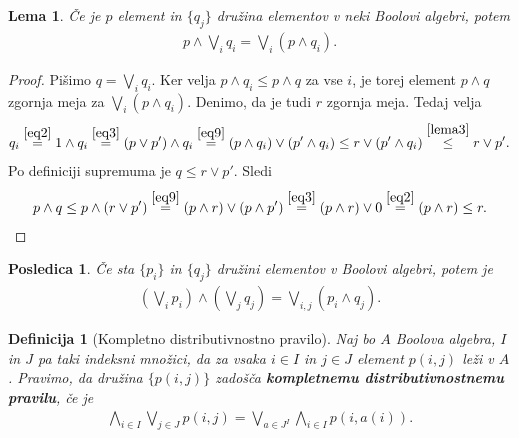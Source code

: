 \documentclass{amsart}
\newtheorem{lema}[izrek]{Lema}
\newtheorem{posledica}[izrek]{Posledica}
\newtheorem{definicija}[izrek]{Definicija}
\begin{document}
\begin{lema}
    Če je \(p\) element in \(\{q_j\}\) družina elementov v neki Boolovi algebri, potem
    \begin{align*}
        p \wedge \bigvee_i q_i = \bigvee_i (p \wedge q_i).
    \end{align*}
    \label{notnes}
\end{lema}

\begin{proof}
    Pišimo \(q = \bigvee_i q_i\). Ker velja \(p \wedge q_i \leq p \wedge q\) za vse \(i\),
    je torej element \(p \wedge q\) zgornja meja za \(\bigvee_i (p \wedge q_i).\)
    Denimo, da je tudi \(r\) zgornja meja. Tedaj velja
    \begin{align*}
        q_i \stackrel{\eqref{eq2}}{=} 1 \wedge q_i \stackrel{\eqref{eq3}}{=} (p \vee p') \wedge q_i \stackrel{\eqref{eq9}}{=} \left(p \wedge q_i\right) \vee
        \left(p' \wedge q_i\right) \leq r \vee \left(p' \wedge q_i\right) \stackrel{\ref{lema3}}{\leq}  r \vee p'.
    \end{align*}
    Po definiciji supremuma je \(q \leq r \vee p'\). Sledi
    \begin{align*}
        p \wedge q \leq p \wedge \left(r \vee p'\right) \stackrel{\eqref{eq9}}{=}
        \left(p \wedge r\right) \vee \left(p \wedge p'\right) \stackrel{\eqref{eq3}}{=} \left(p \wedge r\right) \vee 0 \stackrel{\eqref{eq2}}{=} \left(p \wedge r\right) \leq r.
    \end{align*}
\end{proof}

\begin{posledica}
    Če sta \(\{p_i\}\) in \(\{q_j\}\) družini elementov v Boolovi algebri, potem je 
    \begin{align*}
        \left(\bigvee_i p_i \right) \wedge \left(\bigvee_j q_j \right)=
        \bigvee_{i, j} \left(p_i \wedge q_j\right). 
    \end{align*}
\end{posledica}

\begin{definicija}[Kompletno distributivnostno pravilo]
    Naj bo \(A\) Boolova algebra, $I$ in $J$ pa taki indeksni množici, da za vsaka \(i \in I\) in \(j \in J\) 
    element \(p(i, j)\) leži v $A$. Pravimo, da družina \(\{p(i, j)\}\) zadošča {\bf kompletnemu distributivnostnemu pravilu}, če je 
    \begin{align}
        \label{eq11} \bigwedge_{i \in I} \bigvee_{j \in J} p(i, j) = \bigvee_{a \in J^{I}} \bigwedge_{i \in I} p(i, a(i)).
    \end{align}
\end{definicija}
\end{document}
